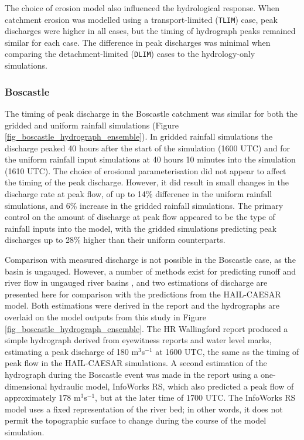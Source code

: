 The choice of erosion model also influenced the hydrological response. When catchment erosion was modelled using a transport-limited (\texttt{TLIM}) case, peak discharges were higher in all cases, but the timing of hydrograph peaks remained similar for each case. The difference in peak discharges was minimal when comparing the detachment-limited (\texttt{DLIM}) cases to the hydrology-only simulations.

\subsubsection{Boscastle}
The timing of peak discharge in the Boscastle catchment was similar for both the gridded and uniform rainfall simulations (Figure \ref{fig_boscastle_hydrograph_ensemble}). In gridded rainfall simulations the discharge peaked 40 hours after the start of the simulation (1600 UTC) and for the uniform rainfall input simulations at 40 hours 10 minutes into the simulation (1610 UTC). The choice of erosional parameterisation did not appear to affect the timing of the peak discharge. However, it did result in small changes in the discharge rate at peak flow, of up to 14\% difference in the uniform rainfall simulations, and 6\% increase in the gridded rainfall simulations. The primary control on the amount of discharge at peak flow appeared to be the type of rainfall inputs into the model, with the gridded simulations predicting peak discharges up to 28\% higher than their uniform counterparts. 

Comparison with measured discharge is not possible in the Boscastle case, as the basin is ungauged. However, a number of methods exist for predicting runoff and river flow in ungauged river basins \citep{sivapalan2003prediction,bloschl2013runoff}, and two estimations of discharge are presented here for comparison with the predictions from the HAIL-CAESAR model. Both estimations were derived in the \citet{wallingford2005flooding} report and the hydrographs are overlaid on the model outputs from this study in Figure \ref{fig_boscastle_hydrograph_ensemble}. The HR Wallingford report produced a simple hydrograph derived from eyewitness reports and water level marks, estimating a peak discharge of 180 m\(^3\)s\(^{-1}\) at 1600 UTC, the same as the timing of peak flow in the HAIL-CAESAR simulations. A second estimation of the hydrograph during the Boscastle event was made in the report using a one-dimensional hydraulic model, InfoWorks RS, which also predicted a peak flow of approximately 178 m\(^3\)s\(^{-1}\), but at the later time of 1700 UTC. The InfoWorks RS model uses a fixed representation of the river bed; in other words, it does not permit the topographic surface to change during the course of the model simulation. 

